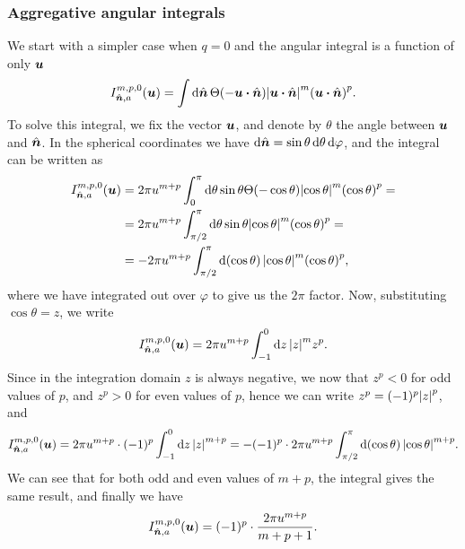 \documentclass[aps,prl,preprint,groupedaddress,10pt]{revtex4-2}
\begin{document}
\subsubsection{Aggregative angular integrals}
We start with a simpler case when $q=0$ and the angular integral is a function of only $\vb*{u}$
\begin{equation}
    I_{\bn,a}^{m,p,0}(\bu)=\int\dd{\bn}\Theta\pqty{-\bu\vdot\bn}
    \abs{\bu\vdot\bn}^m\pqty{\bu\vdot\bn}^p.
\end{equation}
To solve this integral, we fix the vector $\vb*{u}$, and denote by $\theta$ the angle between
$\vb*{u}$ and $\hat{\vb*{n}}$. In the spherical coordinates we have
$\dd{\hat{\vb*{n}}}=\sin\theta\dd{\theta}\dd{\varphi}$, and the integral can be written as
\begin{equation}
    \begin{split}
        I_{\bn,a}^{m,p,0}(\bu)&=2\pi u^{m+p}\int_0^{\pi}\dd{\theta}\sin\theta
        \Theta\pqty{-\cos\theta}\abs{\cos\theta}^m\pqty{\cos\theta}^p=\\
        &=2\pi u^{m+p}\int_{\pi/2}^{\pi}\dd{\theta}\sin\theta
        \abs{\cos\theta}^m\pqty{\cos\theta}^p=\\
        &=-2\pi u^{m+p}\int_{\pi/2}^{\pi}\dd{\pqty{\cos\theta}}
        \abs{\cos\theta}^m\pqty{\cos\theta}^p,
    \end{split}
\end{equation}
where we have integrated out over $\varphi$ to give us the $2\pi$ factor. Now, substituting
$\cos\theta=z$, we write
\begin{equation}
    I_{\hat{\vb*{n}},a}^{m,p,0}(\vb*{u})=2\pi u^{m+p}\int_{-1}^{0}\dd{z}\abs{z}^m z^p.
\end{equation}
Since in the integration domain $z$ is always negative, we now that $z^p<0$ for odd values of
$p$, and $z^p>0$ for even values of $p$, hence we can write $z^p=(-1)^p\abs{z}^p$, and
\begin{equation}
    I_{\bn,a}^{m,p,0}(\bu)=2\pi u^{m+p}\cdot(-1)^p\int_{-1}^{0}\dd{z}\abs{z}^{m+p}=
    -(-1)^p\cdot 2\pi u^{m+p}\int_{\pi/2}^{\pi}\dd{\pqty{\cos\theta}}\abs{\cos\theta}^{m+p}.
\end{equation}
We can see that for both odd and even values of $m+p$, the integral gives the same result,
and finally we have
\begin{equation}
    I_{\hat{\vb*{n}},a}^{m,p,0}(\vb*{u})=(-1)^p\cdot\frac{2\pi u^{m+p}}{m+p+1}.
\end{equation}
\end{document}
